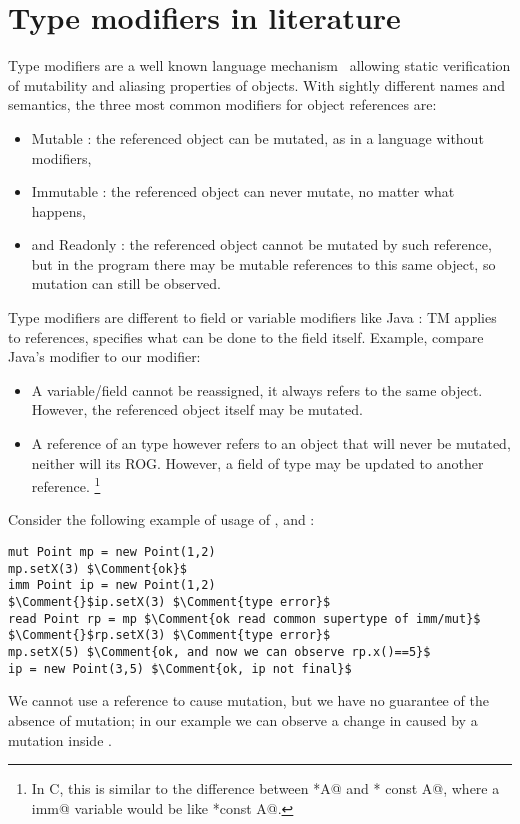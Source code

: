 

\section{Type modifiers  in literature}

Type modifiers are a well known language mechanism~\cite{TschantzErnst05,BirkaErnst04,OstlundEtAl08,clebsch2015deny,GianniniEtAl16,GordonEtAl12} allowing static verification of mutability and aliasing properties of objects.
With sightly different names and semantics, the three most common modifiers for object references are:
\begin{itemize}
\item Mutable \Q@mut@: the referenced object can be mutated, as in a language without modifiers,
\item Immutable \Q@imm@: the referenced object can never mutate, no matter what happens,
\item and Readonly \Q@read@: the referenced object cannot be mutated by such reference, but in the program there may be mutable references to this same object, so mutation can still be observed. 
\end{itemize}
\noindent
Type modifiers are different to field or variable modifiers like Java \Q@final@: TM applies to references,  \Q@final@ specifies what can be done to the field itself.
Example, compare Java's \Q@final@ modifier to our \Q@imm@ modifier:

\begin{itemize}
\item A \Q@final@ variable/field cannot be reassigned, it always refers to the same object. However, the referenced object itself may be mutated.
\item A reference of an \Q@imm@ type however refers to an object that will never be mutated, neither will its ROG. However, a field of type \Q@imm@ may be updated to another \Q@imm@ reference.
\footnote{In C, this is similar to the difference between \Q@const *A@ and \Q@* const A@, where a \Q@final imm@ variable would be like \Q@const *const A@.}
\end{itemize}



\noindent Consider the following  example of usage of \Q@mut@, \Q@imm@ and \Q@read@:
\begin{lstlisting}
mut Point mp = new Point(1,2)
mp.setX(3) $\Comment{ok}$
imm Point ip = new Point(1,2)
$\Comment{}$ip.setX(3) $\Comment{type error}$
read Point rp = mp $\Comment{ok read common supertype of imm/mut}$
$\Comment{}$rp.setX(3) $\Comment{type error}$
mp.setX(5) $\Comment{ok, and now we can observe rp.x()==5}$
ip = new Point(3,5) $\Comment{ok, ip not final}$
\end{lstlisting}
\noindent We cannot use a \Q@read@ reference to cause mutation, but we have no guarantee of the absence of mutation; in our example we can observe a change in \Q@rp@ caused by a mutation inside \Q@mp@.
 
